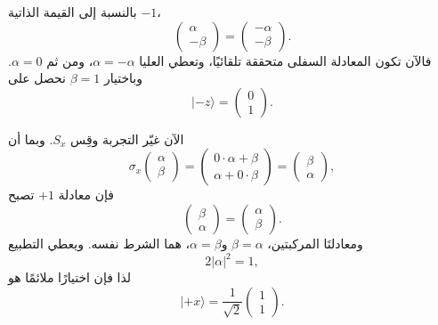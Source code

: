بالنسبة إلى القيمة الذاتية \(-1\)،
\begin{equation}
\begin{pmatrix}
\alpha\\
-\beta
\end{pmatrix}
=
\begin{pmatrix}
-\alpha\\
-\beta
\end{pmatrix}.
\end{equation}
فالآن تكون المعادلة السفلى متحققة تلقائيًا، وتعطي العليا \(\alpha=-\alpha\)، ومن ثم \(\alpha=0\). وباختيار \(\beta=1\) نحصل على
\begin{equation}
|-z\rangle=
\begin{pmatrix}
0\\
1
\end{pmatrix}.
\end{equation}

الآن غيّر التجربة وقِس \(S_x\). وبما أن
\begin{equation}
\sigma_x
\begin{pmatrix}
\alpha\\
\beta
\end{pmatrix}
=
\begin{pmatrix}
0\cdot\alpha+\beta\\
\alpha+0\cdot\beta
\end{pmatrix}
=
\begin{pmatrix}
\beta\\
\alpha
\end{pmatrix},
\end{equation}
فإن معادلة \(+1\) تصبح
\begin{equation}
\begin{pmatrix}
\beta\\
\alpha
\end{pmatrix}
=
\begin{pmatrix}
\alpha\\
\beta
\end{pmatrix}.
\end{equation}
ومعادلتَا المركبتين، \(\beta=\alpha\) و\(\alpha=\beta\)، هما الشرط نفسه. ويعطي التطبيع
\begin{equation}
2|\alpha|^2=1,
\end{equation}
لذا فإن اختيارًا ملائمًا هو
\begin{equation}
|+x\rangle
=
\frac{1}{\sqrt2}
\begin{pmatrix}
1\\
1
\end{pmatrix}.
\end{equation}

